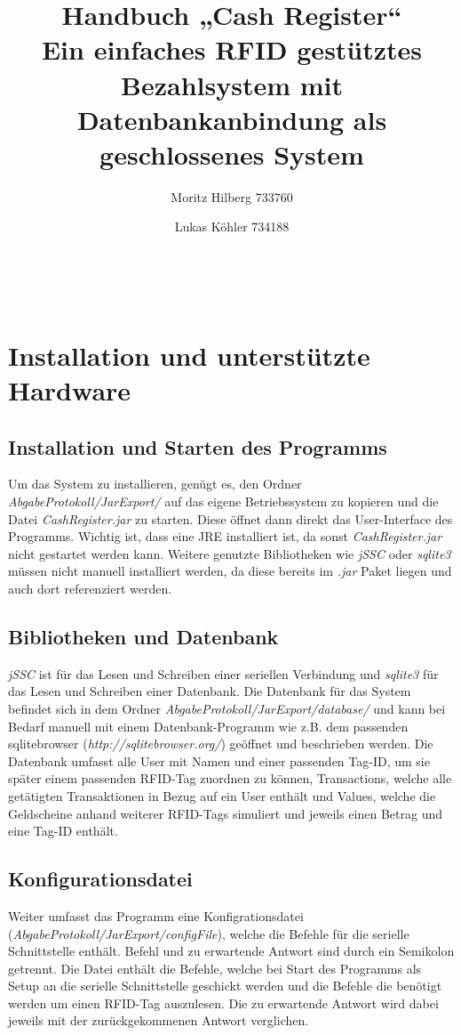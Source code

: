 \documentclass[11pt]{article} %
\title{Handbuch „Cash Register“ \\ \large Ein einfaches RFID gestütztes Bezahlsystem mit Datenbankanbindung als geschlossenes System}
\author{Moritz Hilberg 733760 \and Lukas Köhler 734188}
\begin{document}
\maketitle
~\newline
\newline
\newline
\newline
\newline
\tableofcontents
\newpage
\section{Installation und unterstützte Hardware}
\subsection{Installation und Starten des Programms}
Um das System zu installieren, genügt es, den Ordner
\textit{AbgabeProtokoll/JarExport/} auf das eigene Betriebssystem zu kopieren
und die Datei \textit{CashRegister.jar} zu starten. Diese öffnet dann direkt das
User-Interface des Programms. Wichtig ist, dass eine JRE installiert ist, da
sonst \textit{CashRegister.jar} nicht gestartet werden kann. Weitere genutzte
Bibliotheken wie \textit{jSSC} oder \textit{sqlite3} müssen nicht manuell
installiert werden, da diese bereits im \textit{.jar} Paket liegen und auch dort
referenziert werden.
\subsection{Bibliotheken und Datenbank}
\textit{jSSC} ist für das Lesen und Schreiben einer
seriellen Verbindung und \textit{sqlite3} für das Lesen und Schreiben einer
Datenbank. Die Datenbank für das System befindet sich in dem Ordner
\textit{AbgabeProtokoll/JarExport/database/} und kann bei Bedarf manuell mit
einem Datenbank-Programm wie z.B. dem passenden sqlitebrowser
(\textit{http://sqlitebrowser.org/}) geöffnet und beschrieben werden. Die
Datenbank umfasst alle User mit Namen und einer passenden Tag-ID, um sie später
einem passenden RFID-Tag zuordnen zu können, Transactions, welche alle
getätigten Transaktionen in Bezug auf ein User enthält und Values, welche die
Geldscheine anhand weiterer RFID-Tags simuliert und jeweils einen Betrag und 
eine Tag-ID enthält. 
\subsection{Konfigurationsdatei}
Weiter umfasst das Programm eine Konfigrationsdatei
(\textit{AbgabeProtokoll/JarExport/configFile}), welche die Befehle für die
serielle Schnittstelle enthält. Befehl und zu erwartende Antwort sind durch ein
Semikolon getrennt. Die Datei enthält die Befehle, welche bei Start
des Programms als Setup an die serielle Schnittstelle geschickt werden und die
Befehle die benötigt werden um einen RFID-Tag auszulesen. Die zu erwartende
Antwort wird dabei jeweils mit der zurückgekommenen Antwort verglichen.
\end{document}
